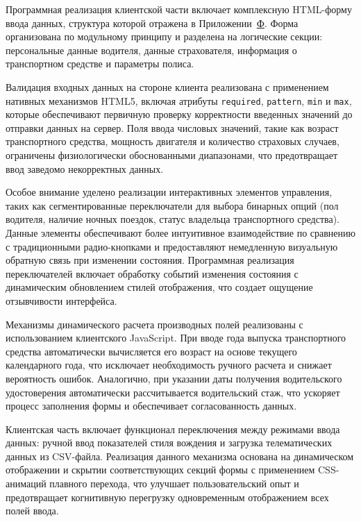Программная реализация клиентской части включает комплексную HTML-форму ввода данных, структура которой отражена в Приложении~\hyperref[app:html_form]{Ф}. Форма организована по модульному принципу и разделена на логические секции: персональные данные водителя, данные страхователя, информация о транспортном средстве и параметры полиса.

Валидация входных данных на стороне клиента реализована с применением нативных механизмов HTML5, включая атрибуты \texttt{required}, \texttt{pattern}, \texttt{min} и \texttt{max}, которые обеспечивают первичную проверку корректности введенных значений до отправки данных на сервер. Поля ввода числовых значений, такие как возраст транспортного средства, мощность двигателя и количество страховых случаев, ограничены физиологически обоснованными диапазонами, что предотвращает ввод заведомо некорректных данных.

Особое внимание уделено реализации интерактивных элементов управления, таких как сегментированные переключатели для выбора бинарных опций (пол водителя, наличие ночных поездок, статус владельца транспортного средства). Данные элементы обеспечивают более интуитивное взаимодействие по сравнению с традиционными радио-кнопками и предоставляют немедленную визуальную обратную связь при изменении состояния. Программная реализация переключателей включает обработку событий изменения состояния с динамическим обновлением стилей отображения, что создает ощущение отзывчивости интерфейса.

Механизмы динамического расчета производных полей реализованы с использованием клиентского JavaScript. При вводе года выпуска транспортного средства автоматически вычисляется его возраст на основе текущего календарного года, что исключает необходимость ручного расчета и снижает вероятность ошибок. Аналогично, при указании даты получения водительского удостоверения автоматически рассчитывается водительский стаж, что ускоряет процесс заполнения формы и обеспечивает согласованность данных.

Клиентская часть включает функционал переключения между режимами ввода данных: ручной ввод показателей стиля вождения и загрузка телематических данных из CSV-файла. Реализация данного механизма основана на динамическом отображении и скрытии соответствующих секций формы с применением CSS-анимаций плавного перехода, что улучшает пользовательский опыт и предотвращает когнитивную перегрузку одновременным отображением всех полей ввода.

